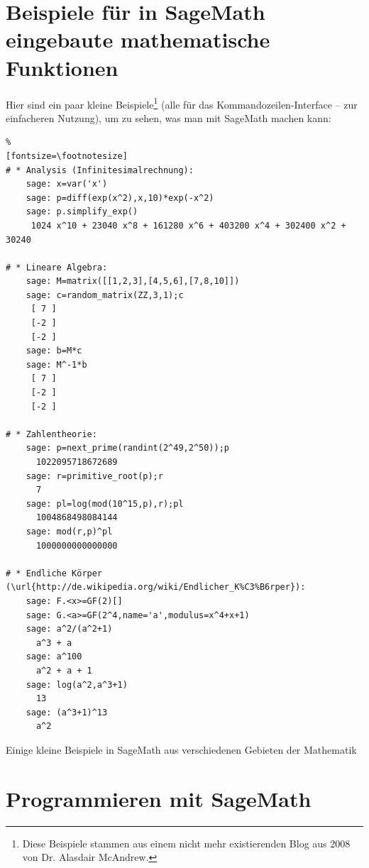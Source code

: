 \section*{Beispiele für in SageMath eingebaute mathematische Funktionen}

Hier sind ein paar kleine Beispiele\footnote{%
Diese Beispiele stammen aus einem nicht mehr existierenden Blog aus 2008 von Dr. Alasdair McAndrew.
}
(alle für das Kommandozeilen-Interface -- zur einfacheren Nutzung), um zu sehen,
was man mit SageMath machen kann:

\begin{sagecode}
\begin{Verbatim}%
[fontsize=\footnotesize]
# * Analysis (Infinitesimalrechnung):
    sage: x=var('x')
    sage: p=diff(exp(x^2),x,10)*exp(-x^2)
    sage: p.simplify_exp()
     1024 x^10 + 23040 x^8 + 161280 x^6 + 403200 x^4 + 302400 x^2 + 30240

# * Lineare Algebra:
    sage: M=matrix([[1,2,3],[4,5,6],[7,8,10]])
    sage: c=random_matrix(ZZ,3,1);c
     [ 7 ]
     [-2 ]
     [-2 ]
    sage: b=M*c
    sage: M^-1*b
     [ 7 ]
     [-2 ]
     [-2 ]

# * Zahlentheorie:
    sage: p=next_prime(randint(2^49,2^50));p
      1022095718672689
    sage: r=primitive_root(p);r
      7
    sage: pl=log(mod(10^15,p),r);pl
      1004868498084144
    sage: mod(r,p)^pl
      1000000000000000

# * Endliche Körper (\url{http://de.wikipedia.org/wiki/Endlicher_K%C3%B6rper}):
    sage: F.<x>=GF(2)[]
    sage: G.<a>=GF(2^4,name='a',modulus=x^4+x+1)
    sage: a^2/(a^2+1)
      a^3 + a
    sage: a^100
      a^2 + a + 1
    sage: log(a^2,a^3+1)
      13
    sage: (a^3+1)^13
      a^2
\end{Verbatim}
\caption{Einige kleine Beispiele in SageMath aus verschiedenen Gebieten der Mathematik}
\end{sagecode}



\section*{Programmieren mit SageMath}

